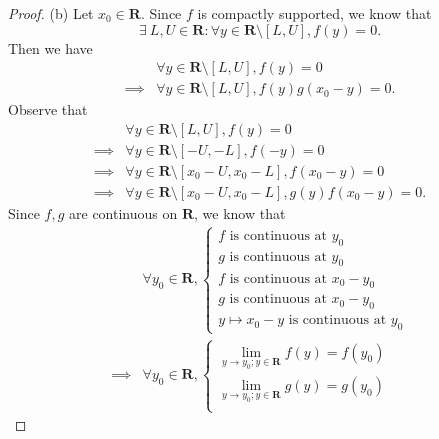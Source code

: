 \begin{proof}{(b)}
    Let \(x_0 \in \mathbf{R}\).
    Since \(f\) is compactly supported, we know that
    \[
        \exists\ L, U \in \mathbf{R} : \forall y \in \mathbf{R} \setminus [L, U], f(y) = 0.
    \]
    Then we have
    \begin{align*}
                 & \forall y \in \mathbf{R} \setminus [L, U], f(y) = 0             \\
        \implies & \forall y \in \mathbf{R} \setminus [L, U], f(y) g(x_0 - y) = 0.
    \end{align*}
    Observe that
    \begin{align*}
                 & \forall y \in \mathbf{R} \setminus [L, U], f(y) = 0                         \\
        \implies & \forall y \in \mathbf{R} \setminus [-U, -L], f(-y) = 0                      \\
        \implies & \forall y \in \mathbf{R} \setminus [x_0 - U, x_0 - L], f(x_0 - y) = 0       \\
        \implies & \forall y \in \mathbf{R} \setminus [x_0 - U, x_0 - L], g(y) f(x_0 - y) = 0.
    \end{align*}
    Since \(f, g\) are continuous on \(\mathbf{R}\), we know that
    \begin{align*}
                 & \forall y_0 \in \mathbf{R}, \begin{cases}
                                                   f \text{ is continuous at } y_0       \\
                                                   g \text{ is continuous at } y_0       \\
                                                   f \text{ is continuous at } x_0 - y_0 \\
                                                   g \text{ is continuous at } x_0 - y_0 \\
                                                   y \mapsto x_0 - y \text{ is continuous at } y_0
                                               \end{cases}                                         \\
        \implies & \forall y_0 \in \mathbf{R}, \begin{cases}
                                                   \lim_{y \to y_0 ; y \in \mathbf{R}} f(y) = f(y_0)             \\
                                                   \lim_{y \to y_0 ; y \in \mathbf{R}} g(y) = g(y_0)             \\

\end{cases}
\end{align*}
\end{proof}
